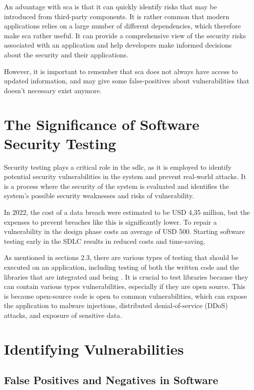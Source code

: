 An advantage with \acrshort{sca} is that it can quickly identify risks that may be introduced from third-party components. It is rather common that modern applications relies on a large number of  different dependencies, which therefore make \acrshort{sca} rather useful. It can provide a comprehensive view of the security risks associated with an application and help developers make informed decisions about the security and their applications. 

However, it is important to remember that \acrshort{sca} does not always have access to updated information, and may give some false-positives about vulnerabilities that doesn't necessary exist anymore. 



\section{The Significance of Software Security Testing}
Security testing plays a critical role in the \acrlong{sdlc}, as it is employed to identify potential security vulnerabilities in the system and prevent real-world attacks. It is a process where the security of the system is evaluated and identifies the system's possible security weaknesses and risks of vulnerability.\cite{whysectest}

In 2022, the cost of a data breach were estimated to be USD 4,35 million\cite{databreach}, but the expenses to prevent breaches like this is significantly lower. To repair a vulnerability in the design phase costs an average of USD 500\cite{fixvulnerability}. Starting software testing early in the SDLC results in reduced costs and time-saving. 

As mentioned in sections 2.3, there are various types of testing that should be executed on an application, including testing of both the written code and the libraries that are integrated and being . It is crucial to test libraries because they can contain various types vulnerabilities, especially if they are open source. This is because open-source code is open to common vulnerabilities, which can expose the application to malware injections, distributed denial-of-service (DDoS) attacks, and exposure of sensitive data. \cite{testlibaries}

\section{Identifying Vulnerabilities}
\subsection{False Positives and Negatives in Software}
